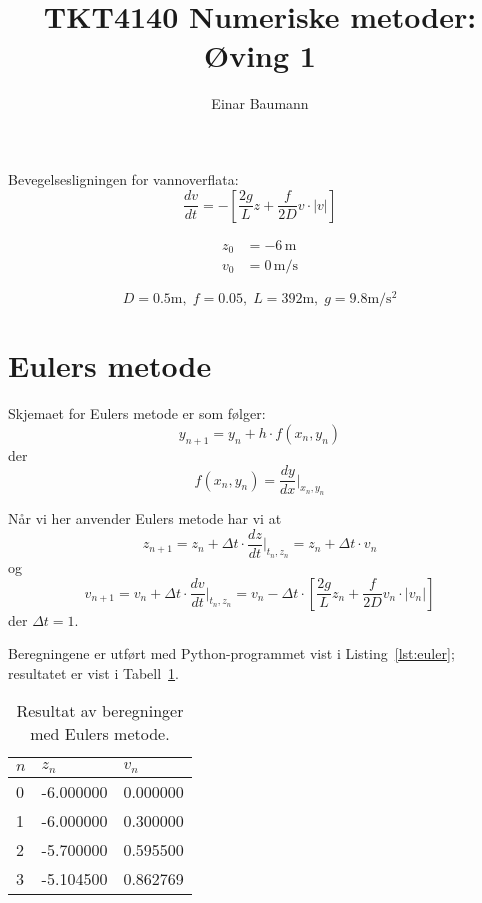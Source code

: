 



\title{TKT4140 Numeriske metoder: Øving 1}
\author{Einar Baumann}


\maketitle
\pagebreak

Bevegelsesligningen for vannoverflata:
\begin{equation}
  \frac{dv}{dt} = - \left[ \frac{2g}{L}z + \frac{f}{2D}v \cdot |v| \right]
  \label{eq:main}
\end{equation}

\begin{align*}
  z_0 & = -6\, \mathrm{m} \\
  v_0 & = 0\, \mathrm{m/s}
\end{align*}

\begin{equation*}
  D=0.5 \mathrm{m},\; f=0.05, \; L=392 \mathrm{m}, \; g=9.8 \mathrm{m/s^2}
\end{equation*}


\section{Eulers metode} %
\label{sec:eulers_metode}
Skjemaet for Eulers metode er som følger:
\begin{equation}
  y_{n+1} = y_n + h\cdot f(x_n,y_n)
\end{equation}
der
\begin{equation}
  f(x_n,y_n) = \frac{dy}{dx}\bigg|_{x_n,y_n}
\end{equation}

\noindent Når vi her anvender Eulers metode har vi at
\begin{equation}
  z_{n+1} = z_n + \Delta t \cdot \frac{dz}{dt}\bigg|_{t_n,z_n} =
    z_n + \Delta t \cdot v_n
\end{equation}
og
\begin{equation}
  v_{n+1} = v_n + \Delta t \cdot \frac{dv}{dt}\bigg|_{t_n,z_n} =
    v_n - \Delta t \cdot \left[ \frac{2g}{L}z_n + \frac{f}{2D}v_n \cdot |v_n| \right]
\end{equation}
der $\Delta t = 1$.

Beregningene er utført med Python-programmet vist i Listing~\ref{lst:euler}; resultatet er vist i Tabell~\ref{tab:euler}.

\begin{table}[H]
  \centering
  \caption{Resultat av beregninger med Eulers metode.}
  \label{tab:euler}
  \begin{tabularx}{0.6\textwidth}{XXX}
    \toprule
    $n$ & $z_n$  & $v_n$ \\
    \midrule
    0 &-6.000000 & 0.000000 \\
    1 &-6.000000 & 0.300000 \\
    2 &-5.700000 & 0.595500 \\
    3 &-5.104500 & 0.862769 \\
    \bottomrule
  \end{tabularx}
\end{table}


